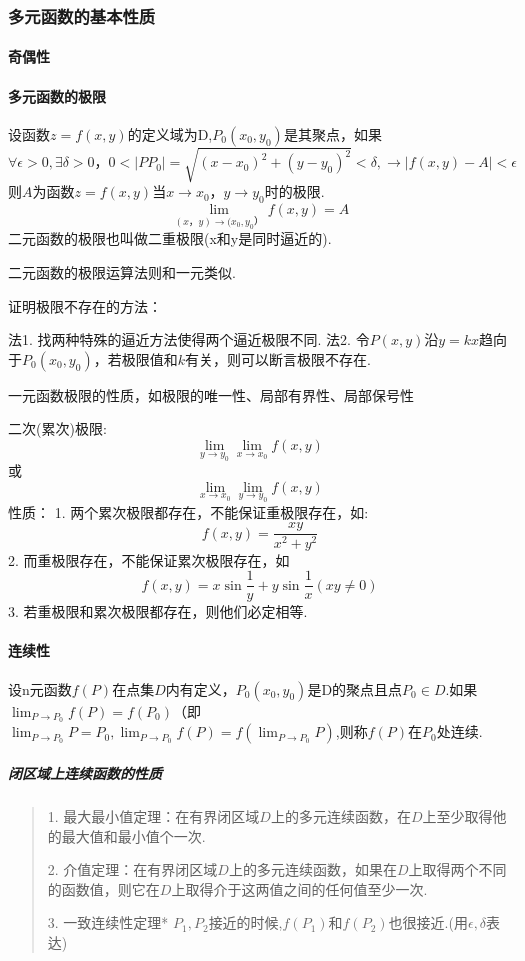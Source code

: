 \documentclass{ctexart}
\begin{document}
      \subsubsection{多元函数的基本性质}
      \paragraph{奇偶性}
      \paragraph{多元函数的极限}
        设函数$z=f(x,y)$的定义域为D,$P_0(x_0,y_0)$是其聚点，如果
          $$\forall \epsilon > 0 , \exists  \delta > 0 ，0 < |PP_0| = \sqrt{(x-x_0)^2 + (y-y_0)^2} < \delta, \rightarrow |f(x,y) - A| < \epsilon$$
          则$A$为函数$z = f(x,y)$当$x \rightarrow x_0，y \rightarrow y_0$时的极限.
          $$\lim_{(x，y) \to (x_0,y_0）} {f(x,y)} = A$$
          二元函数的极限也叫做二重极限(x和y是同时逼近的).

          二元函数的极限运算法则和一元类似.

          证明极限不存在的方法：

          法1. 找两种特殊的逼近方法使得两个逼近极限不同.
          法2. 令$P(x,y)$沿$y=kx$趋向于$P_0(x_0,y_0)$，若极限值和$k$有关，则可以断言极限不存在.

          一元函数极限的性质，如极限的唯一性、局部有界性、局部保号性

          二次(累次)极限:
            $$\lim_{y \to y_0} {\lim_{x \to x_0} {f(x,y)}}$$
              或
            $$\lim_{x \to x_0} {\lim_{y \to y_0} {f(x,y)}}$$
        性质：
          1. 两个累次极限都存在，不能保证重极限存在，如:
          $$f(x,y) = \frac{xy}{x^2+y^2}$$
          2. 而重极限存在，不能保证累次极限存在，如
          $$f(x,y) = x\sin{\frac{1}{y}} + y\sin{\frac{1}{x}}(xy \neq 0)$$
          3. 若重极限和累次极限都存在，则他们必定相等.
    \paragraph{连续性}
        设n元函数$f(P)$在点集$D$内有定义，$P_0(x_0,y_0)$是D的聚点且点$P_0 \in D$.如果$\lim_{P \to P_0}{f(P)} = f(P_0)$（即$\lim_{P \to P_0} P = P_0,\lim_{P \to P_0}{f(P)} = f(\lim_{P \to P_0} P)$,则称$f(P)$在$P_0$处连续.
      \subparagraph{闭区域上连续函数的性质}
        \begin{quote}
          1. 最大最小值定理：在有界闭区域$D$上的多元连续函数，在$D$上至少取得他的最大值和最小值个一次.

          2. 介值定理：在有界闭区域$D$上的多元连续函数，如果在$D$上取得两个不同的函数值，则它在$D$上取得介于这两值之间的任何值至少一次.

          3. 一致连续性定理*
            $P_1,P_2$接近的时候,$f(P_1)$和$f(P_2)$也很接近.(用$\epsilon,\delta$表达)
        \end{quote}
\end{document}
